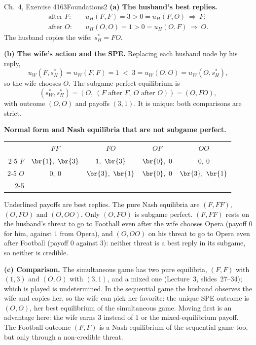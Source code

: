 \begin{exsol}{\MG{} Ch.~4, Exercise 4}{163}{Foundations}{2}
\textbf{(a) The husband's best replies.}
\begin{align*}
  \text{after } F:&\quad u_H(F,F) = 3 > 0 = u_H(F,O) \ \Rightarrow\ F;\\
  \text{after } O:&\quad u_H(O,O) = 1 > 0 = u_H(O,F) \ \Rightarrow\ O .
\end{align*}
The husband copies the wife: $s_H^* = FO$.

\textbf{(b) The wife's action and the SPE.} Replacing each husband node by his reply,
\[
  u_W(F, s_H^*) = u_W(F,F) = 1 \;<\; 3 = u_W(O,O) = u_W(O, s_H^*),
\]
so the wife chooses $O$. The subgame-perfect equilibrium is
\[
  (s_W^*, s_H^*) = (O,\ (F \text{ after } F,\ O \text{ after } O)) = (O, FO),
\]
with outcome $(O,O)$ and payoffs $(3,1)$. It is unique: both comparisons are strict.

\textbf{Normal form and Nash equilibria that are not subgame perfect.}
\begin{center}
\begin{tabular}{r|c|c|c|c|}
\multicolumn{1}{r}{} & \multicolumn{1}{c}{$FF$} & \multicolumn{1}{c}{$FO$} &
\multicolumn{1}{c}{$OF$} & \multicolumn{1}{c}{$OO$}\\ \cline{2-5}
$F$ & $\br{1},\ \br{3}$ & $1,\ \br{3}$ & $\br{0},\ 0$ & $0,\ 0$ \\ \cline{2-5}
$O$ & $0,\ 0$ & $\br{3},\ \br{1}$ & $\br{0},\ 0$ & $\br{3},\ \br{1}$ \\ \cline{2-5}
\end{tabular}
\end{center}
Underlined payoffs are best replies. The pure Nash equilibria are $(F, FF)$, $(O, FO)$ and $(O, OO)$.
Only $(O, FO)$ is subgame perfect. $(F, FF)$ rests on the husband's threat to go to Football even
after the wife chooses Opera (payoff $0$ for him, against $1$ from Opera), and $(O, OO)$ on his threat to
go to Opera even after Football (payoff $0$ against $3$): neither threat is a best reply in its subgame, so
neither is credible.

\textbf{(c) Comparison.} The simultaneous game has two pure equilibria, $(F,F)$ with $(1,3)$ and $(O,O)$
with $(3,1)$, and a mixed one (Lecture~3, slides~27--34); which is played is undetermined. In the sequential
game the husband observes the wife and copies her, so the wife can pick her favorite: the unique SPE
outcome is $(O,O)$, her best equilibrium of the simultaneous game. Moving first is an advantage here: the wife
earns $3$ instead of $1$ or the mixed-equilibrium payoff. The Football outcome $(F,F)$ is a Nash
equilibrium of the sequential game too, but only through a non-credible threat.


\end{exsol}
